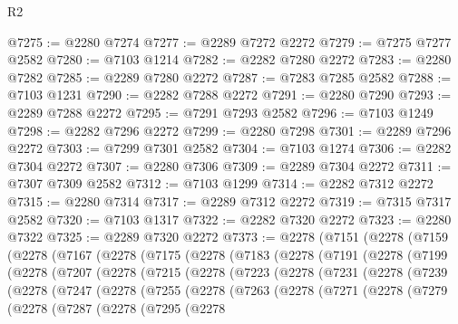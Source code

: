 \begin{lexlean}{R2}
\begin{coremodule}
@7275 := @2280 @7274
@7277 := @2289 @7272 @2272
@7279 := @7275 @7277 @2582
@7280 := @7103 @1214
@7282 := @2282 @7280 @2272
@7283 := @2280 @7282
@7285 := @2289 @7280 @2272
@7287 := @7283 @7285 @2582
@7288 := @7103 @1231
@7290 := @2282 @7288 @2272
@7291 := @2280 @7290
@7293 := @2289 @7288 @2272
@7295 := @7291 @7293 @2582
@7296 := @7103 @1249
@7298 := @2282 @7296 @2272
@7299 := @2280 @7298
@7301 := @2289 @7296 @2272
@7303 := @7299 @7301 @2582
@7304 := @7103 @1274
@7306 := @2282 @7304 @2272
@7307 := @2280 @7306
@7309 := @2289 @7304 @2272
@7311 := @7307 @7309 @2582
@7312 := @7103 @1299
@7314 := @2282 @7312 @2272
@7315 := @2280 @7314
@7317 := @2289 @7312 @2272
@7319 := @7315 @7317 @2582
@7320 := @7103 @1317
@7322 := @2282 @7320 @2272
@7323 := @2280 @7322
@7325 := @2289 @7320 @2272
@7373 := @2278
    (@7151
      (@2278
        (@7159
          (@2278
            (@7167
              (@2278
                (@7175
                  (@2278
                    (@7183
                      (@2278
                        (@7191
                          (@2278
                            (@7199
                              (@2278
                                (@7207
                                  (@2278
                                    (@7215
                                      (@2278
                                        (@7223
                                          (@2278
                                            (@7231
                                              (@2278
                                                (@7239
                                                  (@2278
                                                    (@7247
                                                      (@2278
                                                        (@7255
                                                          (@2278
                                                            (@7263
                                                              (@2278
                                                                (@7271
                                                                  (@2278
                                                                    (@7279
                                                                      (@2278
                                                                        (@7287
                                                                          (@2278
                                                                            (@7295
                                                                              (@2278

\end{coremodule}
\end{lexlean}

